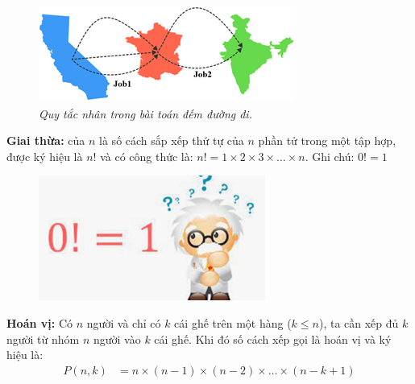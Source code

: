 \begin{multicols}{2}
	\begin{figure}[H]
		\centering
		\vspace*{-5pt}
		\captionsetup{labelformat=empty, justification=centering}
		\includegraphics[width=1\linewidth]{_2}
		\caption{\small\textit{\color{toancuabi}Quy tắc nhân trong bài toán đếm đường đi.}}
		\vspace*{-10pt}
	\end{figure}
	\textbf{\color{toancuabi}Giai thừa:} của $n$ là số cách sắp xếp thứ tự của $n$ phần tử trong một tập hợp, được ký hiệu là $n!$ và có công thức là: $n!=1\times 2\times 3\times \ldots\times n $.
	\vskip 0.1cm
	Ghi chú: $0!=1$
	\begin{figure}[H]
		\centering
		\vspace*{5pt}
		\captionsetup{labelformat=empty, justification=centering}
		\includegraphics[width=1\linewidth]{_3}
		\vspace*{-15pt}
	\end{figure}
	\textbf{\color{toancuabi}Hoán vị:} Có $n$ người và chỉ có $k$ cái ghế trên một hàng ($k\le n$), ta cần xếp đủ $k$ người từ nhóm $n$ người vào $k$ cái ghế. Khi đó số cách xếp gọi là hoán vị và ký hiệu là:
	\begin{align*}
		P(n,k)&=n\!\times\!(n\!-\!1)\!\!\times\!\!(n\!-\!2)\!\!\times\!\!\ldots\!\!\times\!\!(n\!-\!k\!+\!1\!)\\

\end{align*}
\end{multicols}
